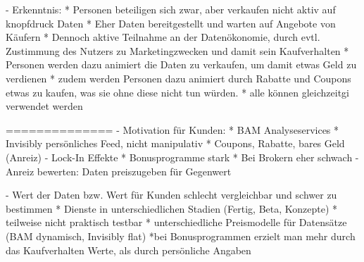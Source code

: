 - Erkenntnis:
    * Personen beteiligen sich zwar, aber verkaufen nicht aktiv auf knopfdruck Daten
    * Eher Daten bereitgestellt und warten auf Angebote von Käufern
    * Dennoch aktive Teilnahme an der Datenökonomie, durch evtl. Zustimmung des Nutzers zu Marketingzwecken und damit sein Kaufverhalten
    * Personen werden dazu animiert die Daten zu verkaufen, um damit etwas Geld zu verdienen
    * zudem werden Personen dazu animiert durch Rabatte und Coupons etwas zu kaufen, was sie ohne diese nicht tun würden.
    * alle können gleichzeitgi verwendet werden



==============
- Motivation für Kunden:
    * BAM Analyseservices
    * Invisibly persönliches Feed, nicht manipulativ
    * Coupons, Rabatte, bares Geld (Anreiz)
- Lock-In Effekte
    * Bonusprogramme stark
    * Bei Brokern eher schwach
- Anreiz bewerten: Daten preiszugeben für Gegenwert

- Wert der Daten bzw. Wert für Kunden schlecht vergleichbar und schwer zu bestimmen
    * Dienste in unterschiedlichen Stadien (Fertig, Beta, Konzepte)
    * teilweise nicht praktisch testbar
    * unterschiedliche Preismodelle für Datensätze (BAM dynamisch, Invisibly flat)
    *bei Bonusprogrammen erzielt man mehr durch das Kaufverhalten Werte, als durch persönliche Angaben